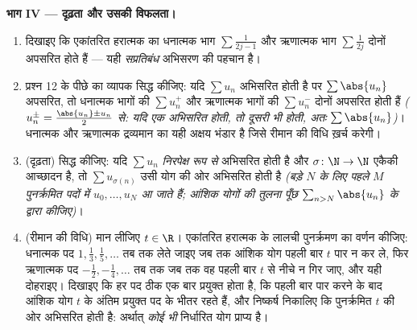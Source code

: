 \begin{problem}[{सप्ताहांत समस्या --- $H_n = \ln n + \gamma +
\frac{1}{2n} + O(n^{-2})$, और $1 - \frac12 +
\frac13 - \dots$ को पुनर्क्रमित करके $\frac{\ln 2}{2}$}]
\medskip \noindent\textbf{भाग IV --- दृढ़ता और उसकी विफलता।}
\begin{enumerate}[resume]
  \item दिखाइए कि एकांतरित हरात्मक  का धनात्मक भाग $\sum
  \frac{1}{2j-1}$ और ऋणात्मक भाग $\sum \frac{1}{2j}$ दोनों अपसरित होते हैं
  --- यही \emph{सप्रतिबंध} अभिसरण की पहचान है।
  \item प्रश्न 12 के पीछे का व्यापक  सिद्ध कीजिए: यदि $\sum u_n$ अभिसरित
  होती है पर $\sum \abs{u_n}$ अपसरित, तो धनात्मक भागों की  $\sum
  u_n^+$ और ऋणात्मक भागों की $\sum u_n^-$ दोनों अपसरित होती हैं
  \emph{($u_n^\pm = \frac{\abs{u_n} \pm u_n}{2}$ से: यदि एक अभिसरित होती, तो
  दूसरी भी होती, अतः $\sum\abs{u_n}$)}। धनात्मक और ऋणात्मक द्रव्यमान का यही
  अक्षय भंडार है जिसे रीमान की विधि ख़र्च करेगी।
  \item (दृढ़ता) सिद्ध कीजिए: यदि $\sum u_n$ \emph{निरपेक्ष रूप से} अभिसरित
  होती है और $\sigma \colon \N \to \N$ एकैकी आच्छादन है, तो $\sum
  u_{\sigma(n)}$ उसी योग की ओर अभिसरित होती है \emph{(बड़े $N$ के लिए पहले
  $M$ पुनर्क्रमित पदों में $u_0, \dots, u_N$ आ जाते हैं; आंशिक योगों की
  तुलना पूँछ $\sum_{n > N}\abs{u_n}$ के द्वारा कीजिए)}।
  \item (रीमान की विधि) मान लीजिए $t \in \R$। एकांतरित हरात्मक  के
  लालची पुनर्क्रमण का वर्णन कीजिए: धनात्मक पद $1, \frac13, \frac15, \dots$
  तब तक लेते जाइए जब तक आंशिक योग पहली बार $t$ पार न कर ले, फिर ऋणात्मक पद
  $-\frac12, -\frac14, \dots$ तब तक जब तक वह पहली बार $t$ से नीचे न गिर जाए,
  और यही दोहराइए। दिखाइए कि हर पद ठीक एक बार प्रयुक्त होता है, कि पहली बार
  पार करने के बाद आंशिक योग $t$ के अंतिम प्रयुक्त पद के भीतर रहते हैं, और
  निष्कर्ष निकालिए कि पुनर्क्रमित  $t$ की ओर अभिसरित होती है: अर्थात्
  \emph{कोई भी} निर्धारित योग प्राप्य है।
\end{enumerate}


\end{problem}
